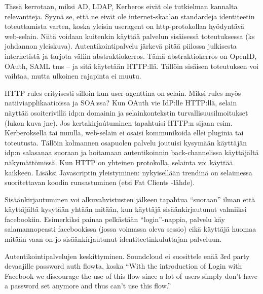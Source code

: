 \documentclass[finnish,gradu]{tktltiki}
\begin{document}
  Tässä kerrotaan, miksi AD, LDAP, Kerberos eivät ole tutkielman kannalta relevantteja. Syynä se, että ne eivät ole internet-skaalan standardeja identiteetin toteuttamista varten, koska yleisin useragent on http-protokollaa hyödyntävä web-selain. Niitä voidaan kuitenkin käyttää palvelun sisäisessä toteutuksessa (ks johdannon yleiskuva). Autentikointipalvelu järkevä pitää piilossa julkisesta internetistä ja tarjota väliin abstraktiokerros. Tämä abstraktiokerros on OpenID, OAuth, SAML tms -- ja sitä käytetään HTTP:llä. Tällöin sisäisen toteutuksen voi vaihtaa, mutta ulkoinen rajapinta ei muutu.

  HTTP rules erityisesti silloin kun user-agenttina on selain. Miksi rules myös natiiviapplikaatioissa ja SOA:ssa?
  Kun OAuth vie IdP:lle HTTP:llä, selain näyttää osoiterivillä idp:n domainin ja selainkontekstin turvallisuusilmoitukset (lukon kuva jne). Jos kertakirjaútuminen tapahtuisi HTTP:n sijaan esim. Kerberoksella tai muulla, web-selain ei osaisi kommunikoida ellei pluginia tai toteutusta. Tällöin kolmannen osapuolen palvelu joutuisi kysymään käyttäjän idp:n salasanaa suoraan ja hoitamaan autentikoinnin back-channelissa käyttäjältä näkymättömissä.
  Kun HTTP on yhteinen protokolla, selainta voi käyttää kaikkeen. Lisäksi Javascriptin yleistyminen: nykyisellään trendinä on selaimessa suoritettavan koodin runsastuminen (etsi Fat Clients -lähde).

  Sisäänkirjautuminen voi alkuvahvistusten jälkeen tapahtua ``suoraan'' ilman että käyttäjältä kysytään yhtään mitään, kun käyttäjä sisäänkirjautunut valmiiksi facebookiin. Esimerkiksi painaa pelkästään ``login''-nappia, palvelu käy salamannopeasti facebookissa (jossa voimassa oleva sessio) eikä käyttäjä huomaa mitään vaan on jo sisäänkirjautunut identiteetinkuluttajan palveluun.

  Autentikointipalvelujen keskittyminen. Soundcloud ei suosittele enää 3rd party devaajille password auth flowta, koska ``With the introduction of Login with Facebook we discourage the use of this flow since a lot of users simply don't have a password set anymore and thus can't use this flow.''


\end{document}
